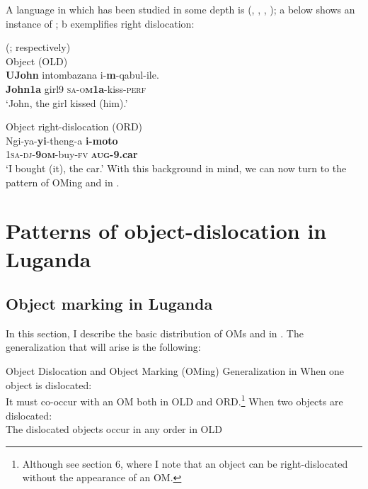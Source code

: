 \documentclass[output=paper,newtxmath,modfonts,nonflat,hidelinks]{langsci/langscibook}
\begin{document}
A  language in which  has been studied in some depth is  (\citealt{vanderSpuy1993}, \citealt{ChengDowning2009}, \citealt{zeller2009,Zeller2015}, \citealt{Halpert2015}); a below shows an instance of ; b exemplifies right dislocation:

\ea\label{ex:ranero:6}
 (\citealt{zeller2009}; \citealt{Zeller2015} respectively)\\
\ea\label{ex:ranero:6a} Object  (OLD)\\
\gll \textbf{UJohn}   intombazana i-\textbf{m}{}-qabul-ile.\\
\textbf{John1a}  girl9      \textsc{sa-o}\textbf{\textsc{m}}\textbf{1a}{}-kiss-\textsc{perf}\\
\glt ‘John, the girl kissed (him).’

\ex\label{ex:ranero:6b}  Object right-dislocation (ORD)\\
\gll Ngi-ya-\textbf{yi}{}-theng-a     \textbf{i-moto}\\
1\textsc{sa}{}-\textsc{dj}{}-\textbf{9\textsc{om}}{}-buy-\textsc{fv} \textbf{\textsc{aug}}\textbf{{}-9.car}\\
\glt ‘I bought (it), the car.’
\z
\z
With this background in mind, we can now turn to the pattern of OMing and  in .

\section{Patterns of object-dislocation in Luganda}\label{sec:ranero:3}
\subsection{Object marking in Luganda}\label{sec:ranero:3.1}
\largerpage

In this section, I describe the basic distribution of OMs and  in . The generalization that will arise is the following:

\ea\label{ex:ranero:7}
Object Dislocation and Object Marking (OMing) Generalization in 
\ea\label{ex:ranero:7a}
When one object is dislocated:\\
\ea\label{ex:ranero:7ai}  It must co-occur with an OM both in OLD and ORD.\footnote{Although see section 6, where I note that an object can be right-dislocated without the appearance of an OM.}
\z
\ex\label{ex:ranero:7b}  
When two objects are dislocated:\\
\ea\label{ex:ranero:7bi}  The dislocated objects occur in any order in OLD\\
\end{document}
